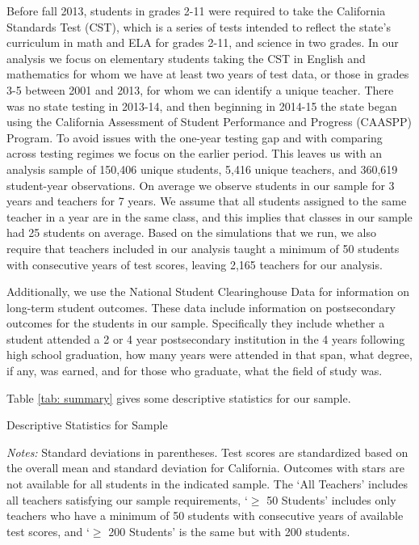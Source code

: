\documentclass[letterpaper,12pt]{article}
\begin{document}
Before fall 2013, students in grades 2-11 were required to take the California Standards Test (CST), which is a series of tests intended to reflect the state's curriculum in math and ELA for grades 2-11, and science in two grades. In our analysis we focus on elementary students taking the CST in English and mathematics for whom we have at least two years of test data, or those in grades 3-5 between 2001 and 2013, for whom we can identify a unique teacher. There was no state testing in 2013-14, and then beginning in 2014-15 the state began using  the California Assessment of Student Performance and Progress (CAASPP) Program. To avoid issues with the one-year testing gap and with comparing across testing regimes we focus on the earlier period. This leaves us with an analysis sample of 150,406 unique students, 5,416 unique teachers, and 360,619 student-year observations. On average we observe students in our sample for 3 years and teachers for 7 years. We assume that all students assigned to the same teacher in a year are in the same class, and this implies that classes in our sample had 25 students on average. Based on the simulations that we run, we also require that teachers included in our analysis taught a minimum of 50 students with consecutive years of test scores, leaving 2,165 teachers for our analysis.

Additionally, we use the National Student Clearinghouse Data for information on long-term student outcomes. These data include information on postsecondary outcomes for the students in our sample. Specifically they include whether a student attended a 2 or 4 year postsecondary institution in the 4 years following high school graduation, how many years were attended in that span, what degree, if any, was earned, and for those who graduate, what the field of study was.

Table \ref{tab: summary} gives some descriptive statistics for our sample.

\begin{table}[ht]
    \centering
    \caption{Descriptive Statistics for Sample}
    
    \label{tab: summary}
    \caption*{\scriptsize \textit{Notes:} Standard deviations in parentheses. Test scores are standardized based on the overall mean and standard deviation for California. Outcomes with stars are not available for all students in the indicated sample. The `All Teachers' includes all teachers satisfying our sample requirements, `$\geq$ 50 Students' includes only teachers who have a minimum of 50 students with consecutive years of available test scores, and `$\geq$ 200 Students' is the same but with 200 students.}
\end{table}
\end{document}
